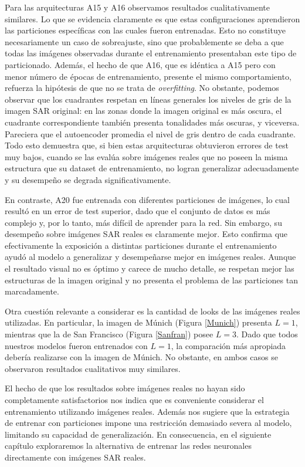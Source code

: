 Para las arquitecturas A15 y A16 observamos resultados cualitativamente similares. Lo que se evidencia claramente es que estas configuraciones aprendieron las particiones específicas con las cuales fueron entrenadas. Esto no constituye necesariamente un caso de sobreajuste, sino que probablemente se deba a que todas las imágenes observadas durante el entrenamiento presentaban este tipo de particionado. Además, el hecho de que A16, que es idéntica a A15 pero con menor número de épocas de entrenamiento, presente el mismo comportamiento, refuerza la hipótesis de que no se trata de \emph{overfitting}. No obstante, podemos observar que los cuadrantes respetan en líneas generales los niveles de gris de la imagen SAR original: en las zonas donde la imagen original es más oscura, el cuadrante correspondiente también presenta tonalidades más oscuras, y viceversa. Pareciera que el autoencoder promedia el nivel de gris dentro de cada cuadrante. Todo esto demuestra que, si bien estas arquitecturas obtuvieron errores de test muy bajos, cuando se las evalúa sobre imágenes reales que no poseen la misma estructura que su dataset de entrenamiento, no logran generalizar adecuadamente y su desempeño se degrada significativamente.

En contraste, A20 fue entrenada con diferentes particiones de imágenes, lo cual resultó en un error de test superior, dado que el conjunto de datos es más complejo y, por lo tanto, más difícil de aprender para la red. Sin embargo, su desempeño sobre imágenes SAR reales es claramente mejor. Esto confirma que efectivamente la exposición a distintas particiones durante el entrenamiento ayudó al modelo a generalizar y desempeñarse mejor en imágenes reales. Aunque el resultado visual no es óptimo y carece de mucho detalle, se respetan mejor las estructuras de la imagen original y no presenta el problema de las particiones tan marcadamente.

Otra cuestión relevante a considerar es la cantidad de looks de las imágenes reales utilizadas. En particular, la imagen de Múnich (Figura \ref{Munich}) presenta $L=1$, mientras que la de San Francisco (Figura \ref{Sanfran}) posee $L=3$. Dado que todos nuestros modelos fueron entrenados con $L=1$, la comparación más apropiada debería realizarse con la imagen de Múnich. No obstante, en ambos casos se observaron resultados cualitativos muy similares.

El hecho de que los resultados sobre imágenes reales no hayan sido completamente satisfactorios nos indica que es conveniente considerar el entrenamiento utilizando imágenes reales. Además nos sugiere que la estrategia de entrenar con particiones impone una restricción demasiado severa al modelo, limitando su capacidad de generalización. En consecuencia, en el siguiente capítulo exploraremos la alternativa de entrenar las redes neuronales directamente con imágenes SAR reales.

